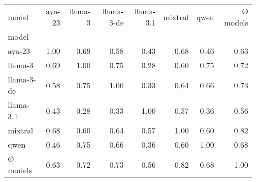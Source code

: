 \begin{tabular}{lrrrrrrr}
\toprule
model & aya-23 & llama-3 & llama-3-de & llama-3.1 & mixtral & qwen & Ø models \\
model &  &  &  &  &  &  &  \\
\midrule
aya-23 & 1.00 & 0.69 & 0.58 & 0.43 & 0.68 & 0.46 & 0.63 \\
llama-3 & 0.69 & 1.00 & 0.75 & 0.28 & 0.60 & 0.75 & 0.72 \\
llama-3-de & 0.58 & 0.75 & 1.00 & 0.33 & 0.64 & 0.66 & 0.73 \\
llama-3.1 & 0.43 & 0.28 & 0.33 & 1.00 & 0.57 & 0.36 & 0.56 \\
mixtral & 0.68 & 0.60 & 0.64 & 0.57 & 1.00 & 0.60 & 0.82 \\
qwen & 0.46 & 0.75 & 0.66 & 0.36 & 0.60 & 1.00 & 0.68 \\
Ø models & 0.63 & 0.72 & 0.73 & 0.56 & 0.82 & 0.68 & 1.00 \\
\bottomrule
\end{tabular}
